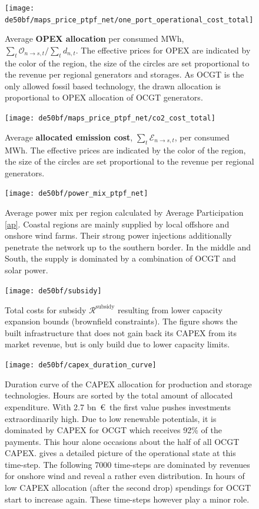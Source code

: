 \documentclass[11pt,twocolumn]{article}
\newcommand{\demand}[1][n]{d_{#1,t}}
\newcommand{\opex}{\mathcal{O}}
\newcommand{\emissioncost}{\mathcal{E}}
\newcommand{\remainingcost}{\mathcal{R}}
\newcommand{\subsidycost}{\remainingcost^\text{subsidy}}
\newcommand{\allocateopex}[1][n \rightarrow s]{\opex_{#1,t}}
\newcommand{\allocateemissioncost}[1][n \rightarrow s]{\emissioncost_{#1,t}}
\begin{document}
\begin{figure}
    \texttt{[image: de50bf/maps\_price\_ptpf\_net/one\_port\_operational\_cost\_total]}
    \caption{Average \textbf{OPEX allocation} per consumed MWh, $\sum_t \allocateopex/\sum_t \demand$. The effective prices for OPEX are indicated by the color of the region, the size of the circles are set proportional to the revenue per regional generators and storages. As OCGT is the only allowed fossil based technology, the drawn allocation is proportional to OPEX allocation of OCGT generators.}
    \label{fig:opex_price}
\end{figure}


\begin{figure}
    \texttt{[image: de50bf/maps\_price\_ptpf\_net/co2\_cost\_total]}
    \caption{Average \textbf{allocated emission cost}, $\sum_t \allocateemissioncost$, per consumed MWh. The effective prices are indicated by the color of the region, the size of the circles are set proportional to the revenue per regional generators.}
    \label{fig:emission_cost}
\end{figure}


\begin{figure}
    \texttt{[image: de50bf/power\_mix\_ptpf\_net]}
    \caption{Average power mix per region calculated by Average Participation \ref{ap}. Coastal regions are mainly supplied by local offshore and onshore wind farms. Their strong power injections additionally penetrate the network up to the southern border. In the middle and South, the supply is dominated by a combination of OCGT and solar power.}
    \label{fig:power_mix}
\end{figure}

\begin{figure}
    \vspace{2cm}
    \texttt{[image: de50bf/subsidy]}
    \caption{Total costs for subsidy $\subsidycost$ resulting from lower capacity expansion bounds (brownfield constraints). The figure shows the built infrastructure that does not gain back its CAPEX from its market revenue, but is only build due to lower capacity limits.}
    \label{fig:subsidy}
\end{figure}


\begin{figure}
    \texttt{[image: de50bf/capex\_duration\_curve]}
    \caption{Duration curve of the CAPEX allocation for production and storage technologies. Hours are sorted by the total amount of allocated expenditure. With 2.7 bn~\euro\, the first value pushes investments extraordinarily high. Due to low renewable potentials, it is dominated by CAPEX for OCGT which receives 92\% of the payments. This hour alone occasions about the half of all OCGT CAPEX.  gives a detailed picture of the operational state at this time-step. The following 7000 time-steps are dominated by revenues for onshore wind and reveal a rather even distribution. In hours of low CAPEX allocation (after the second drop) spendings for OCGT start to increase again. These time-steps however play a minor role.}
    \label{fig:capex_duration_curve}
\end{figure}
\end{document}
